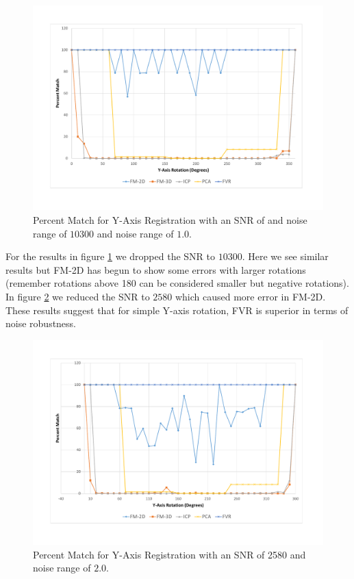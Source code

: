\begin{figure}[t]
\centering
\includegraphics[width=6.0in]{images/results/noise/YRNoise1}
\caption{Percent Match for Y-Axis Registration with an SNR of and noise range of $10300$ and noise range of $1.0$.}
\label{fig:YRNoise1}
\end{figure}

For the results in figure \ref{fig:YRNoise1} we dropped the SNR to $10300$. Here we see similar results but FM-2D has begun to show some errors with larger rotations (remember rotations above 180 can be considered smaller but negative rotations). In figure \ref{fig:YRNoise2} we reduced the SNR to $2580$ which caused more error in FM-2D. These results suggest that for simple Y-axis rotation, FVR is superior in terms of noise robustness. 

\begin{figure}[t]
\centering
\includegraphics[width=6.0in]{images/results/noise/YRNoise2}
\caption{Percent Match for Y-Axis Registration with an SNR of 2580 and noise range of $2.0$.}
\label{fig:YRNoise2}
\end{figure}


